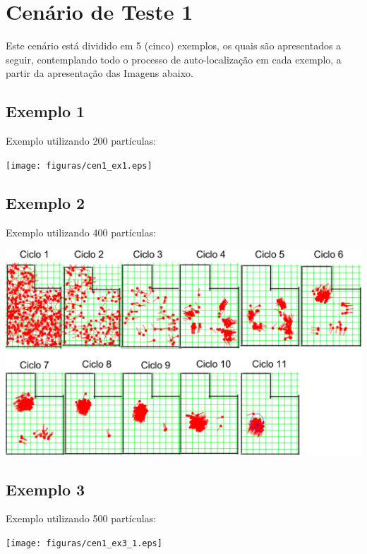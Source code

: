 \section{Cenário de Teste 1}

Este cenário está dividido em 5 (cinco) exemplos, os quais são apresentados a seguir, contemplando todo o processo de auto-localização
em cada exemplo, a partir da apresentação das Imagens abaixo.

\subsection{Exemplo 1}

Exemplo utilizando 200 partículas:

{\centering
\texttt{[image: figuras/cen1\_ex1.eps]}
\label{img:cen1_ex1}
\par}

\subsection{Exemplo 2}

Exemplo utilizando 400 partículas:

{\centering
\includegraphics[scale=0.4]{figuras/cen1_ex2.eps}
\label{img:cen1_ex2}
\par}

\subsection{Exemplo 3}

Exemplo utilizando 500 partículas:

{\centering
\texttt{[image: figuras/cen1\_ex3\_1.eps]}
\label{img:cen1_ex3_1}
\par}

